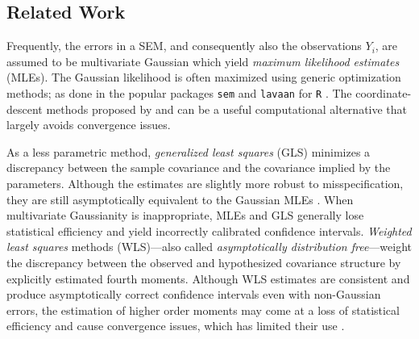 \documentclass[notitlepage]{article}
\begin{document}
\subsection{Related Work}


Frequently, the errors in a SEM, and consequently also the
observations $Y_i$, are assumed to be multivariate Gaussian which
yield \emph{maximum likelihood estimates} (MLEs).  The Gaussian likelihood
is often maximized using generic optimization methods; as done in the
popular packages \texttt{sem} \citep{fox2017sem} and \texttt{lavaan}
\citep{lavaan} for \texttt{R} \citep{r2017}.  The coordinate-descent
methods proposed by \cite{drton2009computing} and
\cite{drton2016computation} can be a useful computational alternative
that largely avoids convergence issues.

As a less parametric method, \emph{generalized least squares} (GLS)
 minimizes a discrepancy
 between the sample covariance and the covariance implied by the
 parameters. Although the estimates are slightly more robust to
 misspecification, they are still asymptotically equivalent to the
 Gaussian MLEs \citep{olsson2000performance}.  When multivariate
 Gaussianity is inappropriate, MLEs and GLS generally lose statistical
 efficiency and yield incorrectly calibrated confidence
 intervals. \emph{Weighted least squares} methods (WLS)---also called
 \emph{asymptotically distribution free}---weight the discrepancy between the
 observed and hypothesized covariance structure by explicitly
 estimated fourth moments. Although WLS estimates are consistent and
 produce asymptotically correct confidence intervals even with
 non-Gaussian errors, the estimation of higher order moments may come at
 a loss of statistical efficiency and cause convergence issues, which
 has limited their use \citep{muthen1992comparison}.
\end{document}
